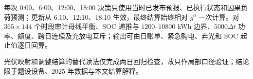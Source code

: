 每次 0:00、6:00、12:00、18:00 决策只使用当时已发布预报、已执行状态和因果负荷预测；更新从 6:10、12:10、18:10 生效，最终结算始终相对 $g^0$ 一次计算。对 $365\times144$ 个时段审计母线平衡、SOC 递推与 $1200$--$10800$ kWh 边界、$5000\Delta t$ 功率、额度、跨日连续及充放电互斥；输出可由日账单、紧急购电、弃光和 SOC 起止值逐日回算。

光伏映射和调整结算的替代读法仅完成两日回归检查，故只作局部口径验证；结论限于题设设备、2025 年数据与本文结算解释。

